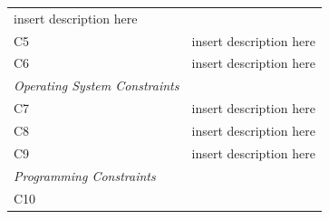 \documentclass[]{article}
\begin{document}
\begin{longtable}[c]{@{}ll@{}}
\begin{minipage}[t]{0.75\columnwidth}
insert description here
\end{minipage}
\\\addlinespace
\begin{minipage}[t]{0.19\columnwidth}\raggedright
C5
\end{minipage} & \begin{minipage}[t]{0.75\columnwidth}\raggedright
insert description here
\end{minipage}
\\\addlinespace
\begin{minipage}[t]{0.19\columnwidth}\raggedright
C6
\end{minipage} & \begin{minipage}[t]{0.75\columnwidth}\raggedright
insert description here
\end{minipage}
\\\addlinespace
\begin{minipage}[t]{0.19\columnwidth}\raggedright
\emph{Operating System Constraints}
\end{minipage}
\\\addlinespace
\begin{minipage}[t]{0.19\columnwidth}\raggedright
C7
\end{minipage} & \begin{minipage}[t]{0.75\columnwidth}\raggedright
insert description here
\end{minipage}
\\\addlinespace
\begin{minipage}[t]{0.19\columnwidth}\raggedright
C8
\end{minipage} & \begin{minipage}[t]{0.75\columnwidth}\raggedright
insert description here
\end{minipage}
\\\addlinespace
\begin{minipage}[t]{0.19\columnwidth}\raggedright
C9
\end{minipage} & \begin{minipage}[t]{0.75\columnwidth}\raggedright
insert description here
\end{minipage}
\\\addlinespace
\begin{minipage}[t]{0.19\columnwidth}\raggedright
\emph{Programming Constraints}
\end{minipage}
\\\addlinespace
\begin{minipage}[t]{0.19\columnwidth}\raggedright
C10
\end{minipage} & \begin{minipage}[t]{0.75\columnwidth}\raggedright

\end{minipage}
\end{longtable}
\end{document}

